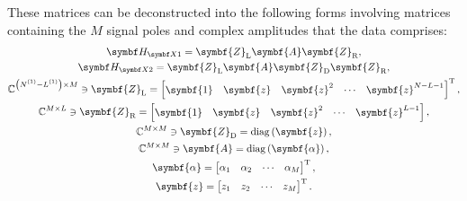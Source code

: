 These matrices can be deconstructed into the following forms involving matrices
containing the $M$ signal poles and complex amplitudes that the data comprises:
\begin{subequations}
   \begin{gather}
       \HXone = \symbf{Z}_{\text{L}} \symbf{A} \symbf{Z}_{\text{R}},\\
       \HXtwo = \symbf{Z}_{\text{L}} \symbf{A} \symbf{Z}_{\text{D}} \symbf{Z}_{\text{R}},\\
       \mathbb{C}^{\left(\None - \Lone\right) \times M} \ni
       \symbf{Z}_{\text{L}} =
       \begin{bmatrix}
           \symbf{1} &
           \symbf{z} &
           \symbf{z}^2 &
           \cdots &
           \symbf{z}^{N-L-1}
        \end{bmatrix}\T,\\
        \mathbb{C}^{M \times L} \ni
        \symbf{Z}_{\text{R}} =
           \begin{bmatrix}
               \symbf{1} & \symbf{z} & {\symbf{z}}^{2} & \cdots & {\symbf{z}}^{L-1}
           \end{bmatrix} ,\\
        \mathbb{C}^{M \times M} \ni
        \symbf{Z}_{\text{D}} = \diag\left(\symbf{z}\right), \label{eq:ZD}\\
        \mathbb{C}^{M \times M} \ni
        \symbf{A} = \diag\left(\symbf{\alpha}\right),\label{eq:A}\\
        \symbf{\alpha} =
        \begin{bmatrix}
            \alpha_1 & \alpha_2 & \cdots & \alpha_M
        \end{bmatrix}\T,\\
        \symbf{z} =
        \begin{bmatrix}
            z_1 & z_2 & \cdots & z_M
        \end{bmatrix}\T.
   \end{gather}
    \label{eq:HX-decomp}
\end{subequations}

